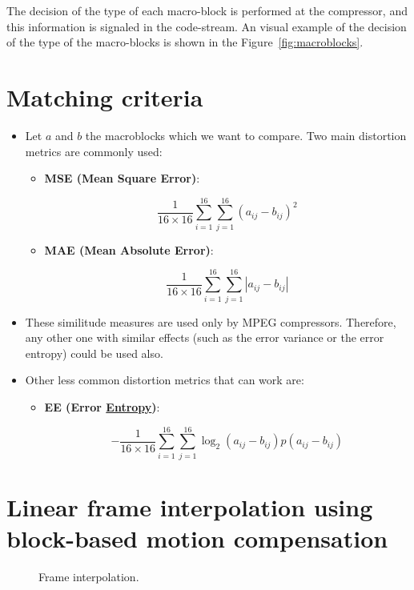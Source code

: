 The decision of the type of each macro-block is performed at the
compressor, and this information is signaled in the code-stream. An
visual example of the decision of the type of the macro-blocks is
shown in the Figure~\ref{fig:macroblocks}.

\section{Matching criteria}
\begin{itemize}
\item
  Let $a$ and $b$ the macroblocks which we want to compare. Two main
  distortion metrics are commonly used:

  \begin{itemize}
  \item
    \textbf{MSE (Mean Square Error)}:

    \begin{equation}
      \frac{1}{16\times 16}\sum_{i=1}^{16}\sum_{j=1}^{16}(a_{ij}-b_{ij})^2
    \end{equation}
  \item
    \textbf{MAE (Mean Absolute Error)}:

    \begin{equation}
      \frac{1}{16\times 16}\sum_{i=1}^{16}\sum_{j=1}^{16}|a_{ij}-b_{ij}|
    \end{equation}
  \end{itemize}
\item
  These similitude measures are used only by MPEG compressors.
  Therefore, any other one with similar effects (such as the error
  variance or the error entropy) could be used also.
\item
  Other less common distortion metrics that can work are:

  \begin{itemize}
  \item
    \textbf{EE (Error
    \href{https://en.wikipedia.org/wiki/Entropy_(information_theory)}{Entropy})}:

    \begin{equation}
      -\frac{1}{16\times 16}\sum_{i=1}^{16}\sum_{j=1}^{16}\log_2(a_{ij}-b_{ij})p(a_{ij}-b_{ij})
    \end{equation}
  \end{itemize}
\end{itemize}

\section{Linear frame interpolation using block-based motion compensation}
\label{sec:linear_frame_interpolation}
\begin{figure}[h]
  \caption{Frame interpolation.}
  \label{fig:frame_interpolation}
\end{figure}


